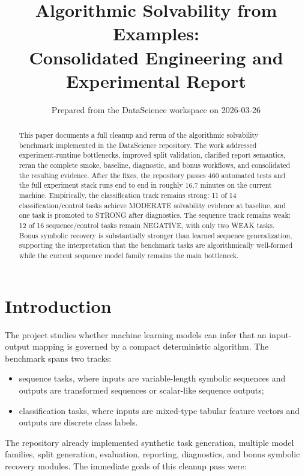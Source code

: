 \documentclass[11pt]{article}
\title{Algorithmic Solvability from Examples:\\Consolidated Engineering and Experimental Report}
\author{Prepared from the DataScience workspace on 2026-03-26}
\date{}
\begin{document}
\maketitle

\begin{abstract}
This paper documents a full cleanup and rerun of the algorithmic solvability benchmark implemented in the DataScience repository. The work addressed experiment-runtime bottlenecks, improved split validation, clarified report semantics, reran the complete smoke, baseline, diagnostic, and bonus workflows, and consolidated the resulting evidence. After the fixes, the repository passes 460 automated tests and the full experiment stack runs end to end in roughly 16.7 minutes on the current machine. Empirically, the classification track remains strong: 11 of 14 classification/control tasks achieve MODERATE solvability evidence at baseline, and one task is promoted to STRONG after diagnostics. The sequence track remains weak: 12 of 16 sequence/control tasks remain NEGATIVE, with only two WEAK tasks. Bonus symbolic recovery is substantially stronger than learned sequence generalization, supporting the interpretation that the benchmark tasks are algorithmically well-formed while the current sequence model family remains the main bottleneck.
\end{abstract}

\section{Introduction}

The project studies whether machine learning models can infer that an input-output mapping is governed by a compact deterministic algorithm. The benchmark spans two tracks:

\begin{itemize}
  \item sequence tasks, where inputs are variable-length symbolic sequences and outputs are transformed sequences or scalar-like sequence outputs;
  \item classification tasks, where inputs are mixed-type tabular feature vectors and outputs are discrete class labels.
\end{itemize}

The repository already implemented synthetic task generation, multiple model families, split generation, evaluation, reporting, diagnostics, and bonus symbolic recovery modules. The immediate goals of this cleanup pass were:
\end{document}
